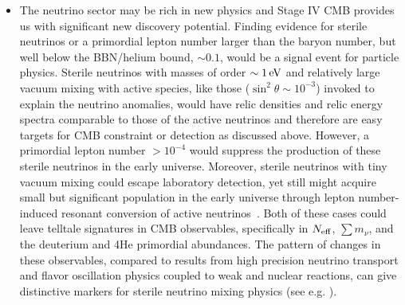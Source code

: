 \begin{itemize}
\item The neutrino sector may be rich in new physics and Stage IV CMB provides us with significant new discovery potential. Finding evidence for sterile neutrinos or a primordial lepton number larger than the baryon number, but well below the BBN/helium bound, $\sim 0.1$, would be a signal event for particle physics. Sterile neutrinos with masses of order $\sim 1\,{\rm eV}$ and relatively large vacuum mixing with active species, like those ($\sin^2 \theta \sim 10^{-3}$) invoked to explain the neutrino anomalies, would have relic densities and relic energy spectra comparable to those of the active neutrinos and therefore are easy targets for CMB constraint or detection as discussed above. However, a primordial lepton number $> {10}^{-4}$ would suppress the production of these sterile neutrinos in the early universe. Moreover, sterile neutrinos with tiny vacuum mixing could escape laboratory detection, yet still might acquire small but significant population in the early universe through lepton number-induced resonant conversion of active neutrinos~\cite{Abazajian:2005gj}. Both of these cases could leave telltale signatures in CMB observables, specifically in $N_{\rm eff}$, $\sum m_\nu$, and the deuterium and 4He primordial abundances. The pattern of changes in these observables, compared to results from high precision neutrino transport and flavor oscillation physics coupled to weak and nuclear reactions, can give distinctive markers for sterile neutrino mixing physics (see e.g. \cite{Smith:2006uw, Grohs:2015tfy}).

\end{itemize}
